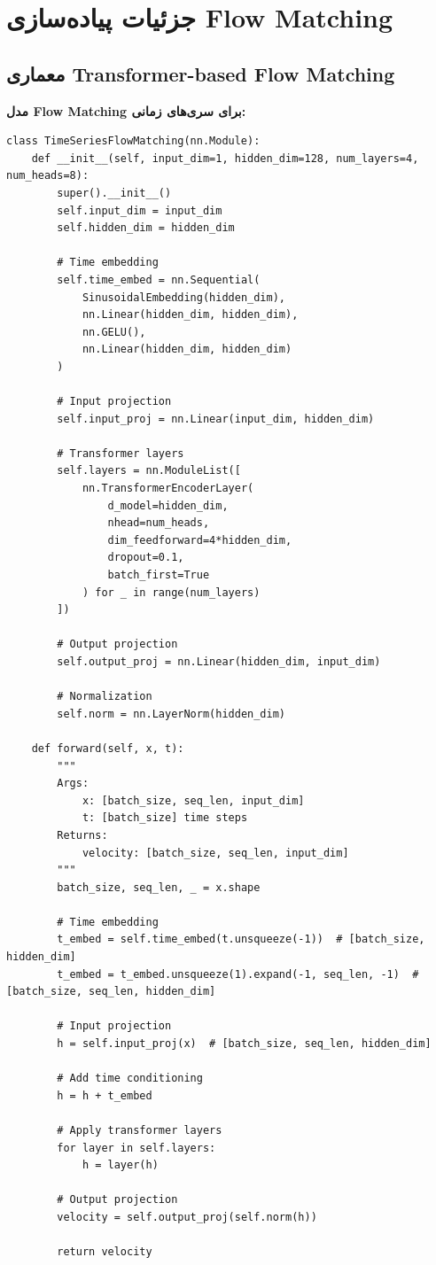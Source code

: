 \section{جزئیات پیاده‌سازی Flow Matching}

\subsection{معماری Transformer-based Flow Matching}

\textbf{مدل Flow Matching برای سری‌های زمانی:}
\begin{verbatim}
class TimeSeriesFlowMatching(nn.Module):
    def __init__(self, input_dim=1, hidden_dim=128, num_layers=4, num_heads=8):
        super().__init__()
        self.input_dim = input_dim
        self.hidden_dim = hidden_dim
        
        # Time embedding
        self.time_embed = nn.Sequential(
            SinusoidalEmbedding(hidden_dim),
            nn.Linear(hidden_dim, hidden_dim),
            nn.GELU(),
            nn.Linear(hidden_dim, hidden_dim)
        )
        
        # Input projection
        self.input_proj = nn.Linear(input_dim, hidden_dim)
        
        # Transformer layers
        self.layers = nn.ModuleList([
            nn.TransformerEncoderLayer(
                d_model=hidden_dim,
                nhead=num_heads,
                dim_feedforward=4*hidden_dim,
                dropout=0.1,
                batch_first=True
            ) for _ in range(num_layers)
        ])
        
        # Output projection
        self.output_proj = nn.Linear(hidden_dim, input_dim)
        
        # Normalization
        self.norm = nn.LayerNorm(hidden_dim)
    
    def forward(self, x, t):
        """
        Args:
            x: [batch_size, seq_len, input_dim]
            t: [batch_size] time steps
        Returns:
            velocity: [batch_size, seq_len, input_dim]
        """
        batch_size, seq_len, _ = x.shape
        
        # Time embedding
        t_embed = self.time_embed(t.unsqueeze(-1))  # [batch_size, hidden_dim]
        t_embed = t_embed.unsqueeze(1).expand(-1, seq_len, -1)  # [batch_size, seq_len, hidden_dim]
        
        # Input projection
        h = self.input_proj(x)  # [batch_size, seq_len, hidden_dim]
        
        # Add time conditioning
        h = h + t_embed
        
        # Apply transformer layers
        for layer in self.layers:
            h = layer(h)
        
        # Output projection
        velocity = self.output_proj(self.norm(h))
        
        return velocity
\end{verbatim}

